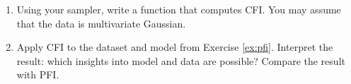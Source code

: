 {\begin{enumerate}
\begin{enumerate}
        \begin{equation}
            \overline{\boldsymbol\Sigma} = \boldsymbol\Sigma_{11} - \boldsymbol\Sigma_{12} \boldsymbol\Sigma_{22}^{-1} \boldsymbol\Sigma_{21}.
        \end{equation}
        As the target here is univariate $q=1$ holds. Learn a function that returns the conditional mean and covariance structure given specific values for the conditioning set.
        \item Then write a function that takes the conditional mean and covariate structure and allows to sample from the respective (multivariate) Gaussian.
    \end{enumerate}
    \item Using your sampler, write a function that computes CFI. You may assume that the data is multivariate Gaussian.
    \item Apply CFI to the dataset and model from Exercise \ref{ex:pfi}. Interpret the result: which insights into model and data are possible? Compare the result with PFI.
\end{enumerate}
}
